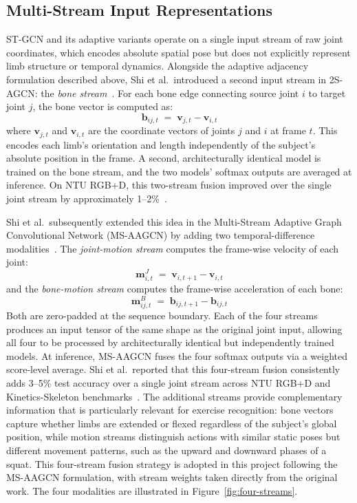 \subsection{Multi-Stream Input Representations}
ST-GCN and its adaptive variants operate on a single input stream of raw joint coordinates, which encodes absolute spatial pose but does not explicitly represent limb structure or temporal dynamics. Alongside the adaptive adjacency formulation described above, Shi et al.\ introduced a second input stream in 2S-AGCN: the \emph{bone stream}~\cite{shi2019two}. For each bone edge connecting source joint $i$ to target joint $j$, the bone vector is computed as:
%
\begin{equation}
    \mathbf{b}_{ij,t} \;=\; \mathbf{v}_{j,t} - \mathbf{v}_{i,t}
    \label{eq:bone-stream}
\end{equation}
%
where $\mathbf{v}_{j,t}$ and $\mathbf{v}_{i,t}$ are the coordinate vectors of joints $j$ and $i$ at frame $t$. This encodes each limb's orientation and length independently of the subject's absolute position in the frame. A second, architecturally identical model is trained on the bone stream, and the two models' softmax outputs are averaged at inference. On NTU RGB+D, this two-stream fusion improved over the single joint stream by approximately 1--2\%~\cite{shi2019two}.

Shi et al.\ subsequently extended this idea in the Multi-Stream Adaptive Graph Convolutional Network (MS-AAGCN) by adding two temporal-difference modalities~\cite{shi2020skeleton}. The \emph{joint-motion stream} computes the frame-wise velocity of each joint:
%
\begin{equation}
    \mathbf{m}^{J}_{i,t} \;=\; \mathbf{v}_{i,t+1} - \mathbf{v}_{i,t}
    \label{eq:joint-motion}
\end{equation}
%
and the \emph{bone-motion stream} computes the frame-wise acceleration of each bone:
%
\begin{equation}
    \mathbf{m}^{B}_{ij,t} \;=\; \mathbf{b}_{ij,t+1} - \mathbf{b}_{ij,t}
    \label{eq:bone-motion}
\end{equation}
%
Both are zero-padded at the sequence boundary. Each of the four streams produces an input tensor of the same shape as the original joint input, allowing all four to be processed by architecturally identical but independently trained models. At inference, MS-AAGCN fuses the four softmax outputs via a weighted score-level average. Shi et al.\ reported that this four-stream fusion consistently adds 3--5\% test accuracy over a single joint stream across NTU RGB+D and Kinetics-Skeleton benchmarks~\cite{shi2020skeleton}. The additional streams provide complementary information that is particularly relevant for exercise recognition: bone vectors capture whether limbs are extended or flexed regardless of the subject's global position, while motion streams distinguish actions with similar static poses but different movement patterns, such as the upward and downward phases of a squat. This four-stream fusion strategy is adopted in this project following the MS-AAGCN formulation, with stream weights taken directly from the original work. The four modalities are illustrated in Figure~\ref{fig:four-streams}.

